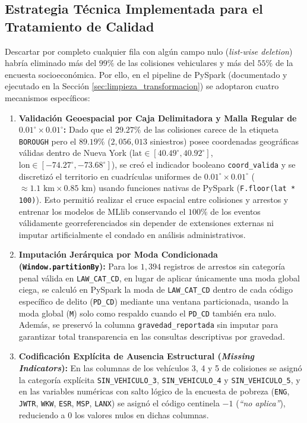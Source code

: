 \subsection{Estrategia Técnica Implementada para el Tratamiento de Calidad}
\label{subsec:tecnicas_faltantes}

Descartar por completo cualquier fila con algún campo nulo (\textit{list-wise deletion}) habría eliminado más del $99\%$ de las colisiones vehiculares y más del $55\%$ de la encuesta socioeconómica. Por ello, en el pipeline de PySpark (documentado y ejecutado en la Sección \ref{sec:limpieza_transformacion}) se adoptaron cuatro mecanismos específicos:

\begin{enumerate}
    \item \textbf{Validación Geoespacial por Caja Delimitadora y Malla Regular de $0.01^\circ \times 0.01^\circ$:} Dado que el $29.27\%$ de las colisiones carece de la etiqueta \texttt{BOROUGH} pero el $89.19\%$ ($2,056,013$ siniestros) posee coordenadas geográficas válidas dentro de Nueva York ($\text{lat} \in [40.49^\circ, 40.92^\circ]$, $\text{lon} \in [-74.27^\circ, -73.68^\circ]$), se creó el indicador booleano \texttt{coord\_valida} y se discretizó el territorio en cuadrículas uniformes de $0.01^\circ \times 0.01^\circ$ ($\approx 1.1\text{ km} \times 0.85\text{ km}$) usando funciones nativas de PySpark (\texttt{F.floor(lat * 100)}). Esto permitió realizar el cruce espacial entre colisiones y arrestos y entrenar los modelos de MLlib conservando el $100\%$ de los eventos válidamente georreferenciados sin depender de extensiones externas ni imputar artificialmente el condado en análisis administrativos.
    \item \textbf{Imputación Jerárquica por Moda Condicionada (\texttt{Window.partitionBy}):} Para los $1,394$ registros de arrestos sin categoría penal válida en \texttt{LAW\_CAT\_CD}, en lugar de aplicar únicamente una moda global ciega, se calculó en PySpark la moda de \texttt{LAW\_CAT\_CD} dentro de cada código específico de delito (\texttt{PD\_CD}) mediante una ventana particionada, usando la moda global (\texttt{M}) solo como respaldo cuando el \texttt{PD\_CD} también era nulo. Además, se preservó la columna \texttt{gravedad\_reportada} sin imputar para garantizar total transparencia en las consultas descriptivas por gravedad.
    \item \textbf{Codificación Explícita de Ausencia Estructural (\textit{Missing Indicators}):} En las columnas de los vehículos 3, 4 y 5 de colisiones se asignó la categoría explícita \texttt{SIN\_VEHICULO\_3}, \texttt{SIN\_VEHICULO\_4} y \texttt{SIN\_VEHICULO\_5}, y en las variables numéricas con salto lógico de la encuesta de pobreza (\texttt{ENG}, \texttt{JWTR}, \texttt{WKW}, \texttt{ESR}, \texttt{MSP}, \texttt{LANX}) se asignó el código centinela $-1$ (\textit{``no aplica''}), reduciendo a $0$ los valores nulos en dichas columnas.

\end{enumerate}
